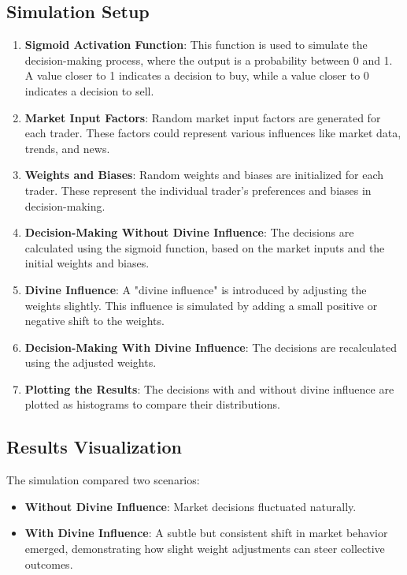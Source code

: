 \documentclass{article}
\begin{document}
\subsection{Simulation Setup}
\begin{enumerate}
\item  {\bf Sigmoid Activation Function}: This function is used to simulate the decision-making process, where the output is a probability between 0 and 1. A value closer to 1 indicates a decision to buy, while a value closer to 0 indicates a decision to sell.
 
\item  {\bf Market Input Factors}: Random market input factors are generated for each trader. These factors could represent various influences like market data, trends, and news.
 
\item  {\bf Weights and Biases}: Random weights and biases are initialized for each trader. These represent the individual trader's preferences and biases in decision-making.
 
\item  {\bf Decision-Making Without Divine Influence}: The decisions are calculated using the sigmoid function, based on the market inputs and the initial weights and biases.
 
\item  {\bf Divine Influence}: A "divine influence" is introduced by adjusting the weights slightly. This influence is simulated by adding a small positive or negative shift to the weights.
 
\item  {\bf Decision-Making With Divine Influence}: The decisions are recalculated using the adjusted weights.
 
\item  {\bf Plotting the Results}: The decisions with and without divine influence are plotted as histograms to compare their distributions.
\end{enumerate}


\subsection{Results Visualization}

The simulation compared two scenarios:
\begin{itemize}
\item  {\bf Without Divine Influence}: Market decisions fluctuated naturally.  
\item  {\bf With Divine Influence}: A subtle but consistent shift in market behavior emerged, demonstrating how slight weight adjustments can steer collective outcomes.
\end{itemize}
\end{document}

